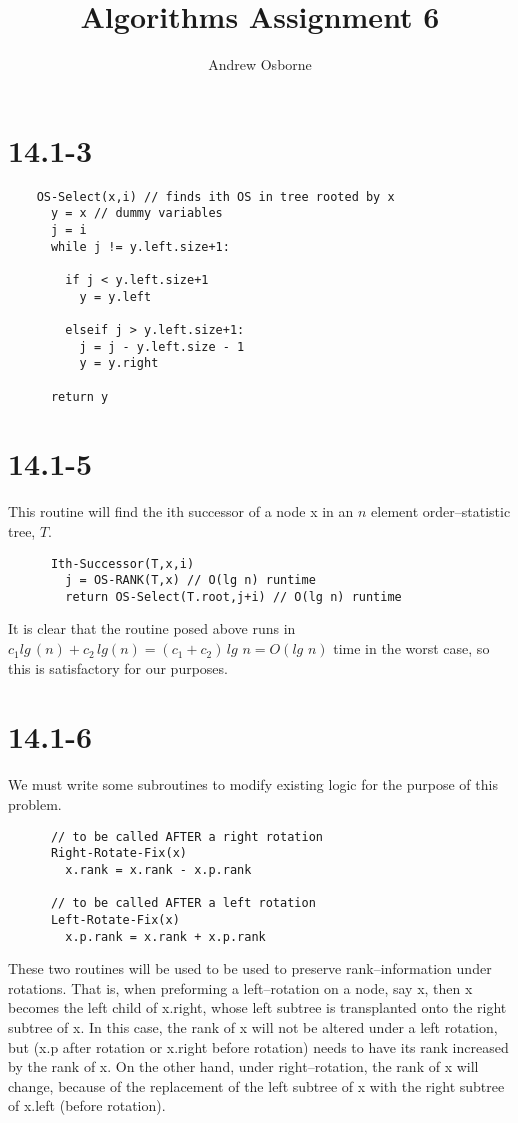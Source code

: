 \documentclass{article}
\author{Andrew Osborne }
\title{Algorithms Assignment 6}
\begin{document}
  \maketitle

  \section*{14.1-3}
  \begin{verbatim}
    OS-Select(x,i) // finds ith OS in tree rooted by x
      y = x // dummy variables
      j = i
      while j != y.left.size+1:

        if j < y.left.size+1
          y = y.left

        elseif j > y.left.size+1:
          j = j - y.left.size - 1
          y = y.right

      return y

  \end{verbatim}

  \section*{14.1-5}
    This routine will find the ith successor of a node x in an $n$ element
    order--statistic tree, $T$.

    \begin{verbatim}
      Ith-Successor(T,x,i)
        j = OS-RANK(T,x) // O(lg n) runtime
        return OS-Select(T.root,j+i) // O(lg n) runtime
    \end{verbatim}
    It is clear that the routine posed above runs in $c_{1}lg\,(n) + c_{2}\, lg(n) = (c_1 + c_2)\, lg\,\,n = O(lg\,\,n)$ time in the worst case, so this is satisfactory for our purposes.

  \section*{14.1-6}
    We must write some subroutines to modify existing logic for the purpose of this problem.

    \begin{verbatim}
      // to be called AFTER a right rotation
      Right-Rotate-Fix(x)
        x.rank = x.rank - x.p.rank

      // to be called AFTER a left rotation
      Left-Rotate-Fix(x)
        x.p.rank = x.rank + x.p.rank

    \end{verbatim}
    These two routines will be used to be used to preserve rank--information under rotations.
    That is, when preforming a left--rotation on a node, say x, then x becomes the left child of x.right, whose left subtree is transplanted onto the right subtree of x. In this case, the rank of x will not be altered under a left rotation, but (x.p after rotation or x.right before rotation) needs to have its rank increased by the rank of x.
    On the other hand, under right--rotation, the rank of x will change, because of the replacement of the left subtree of x with the right subtree of x.left (before rotation).
\end{document}
